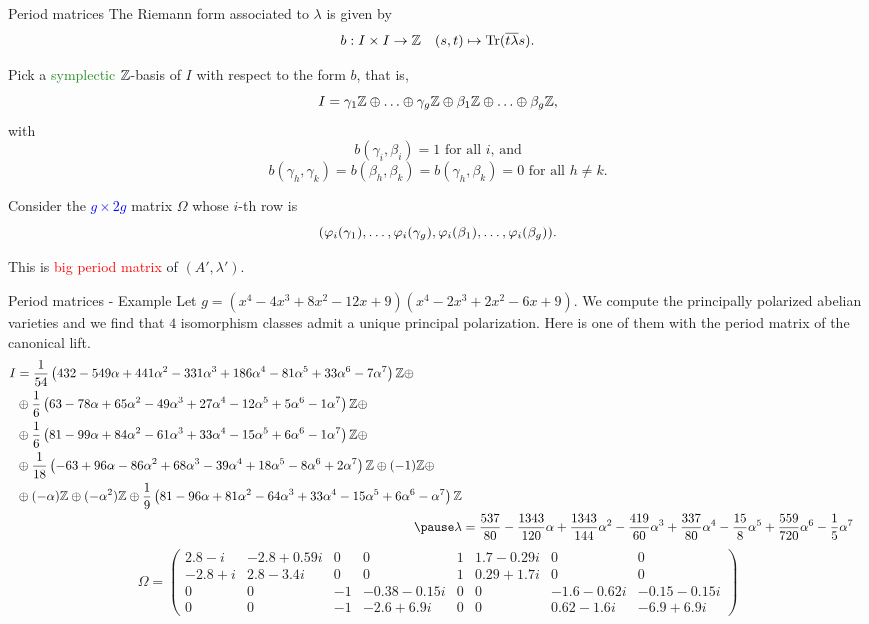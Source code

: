 \documentclass[usenames,dvipsnames,handout]{beamer}
\newcommand{\red}[1]{\textcolor{red}{#1}}
\newcommand{\blue}[1]{\textcolor{blue}{#1}}
\newcommand{\green}[1]{\textcolor{ForestGreen}{#1}}
\begin{document}
\begin{frame}{ Period matrices }
   The Riemann form associated to $\lambda$ is given by
   \[ b:I\times I \to \mathbb{Z} \quad (s,t)\mapsto \operatorname{Tr}(\overline{t\lambda}s). \]
    
   \pause Pick a \green{symplectic} $\mathbb{Z}$-basis of $I$ with respect to the form $b$, that is,
    \[ I = \gamma_1 \mathbb{Z} \oplus \ldots \oplus \gamma_g \mathbb{Z} \oplus \beta_1 \mathbb{Z} \oplus \ldots \oplus \beta_g \mathbb{Z}, \]
    \pause with
    \[ b(\gamma_i,\beta_i)=1 \text{ for all $i$, and}\]
    \[b(\gamma_h,\gamma_k)=b(\beta_h,\beta_k)=b(\gamma_h,\beta_k)=0 \text{ for all $h\neq k$}. \]
    
    \pause Consider the \blue{$g\times 2g$} matrix $\Omega$ whose $i$-th row is 
    \[({\varphi}_i(\gamma_1),\ldots,{\varphi}_i(\gamma_g),{\varphi}_i(\beta_1),\ldots,{\varphi}_i(\beta_g)).\]
    
    \pause This is \red{big period matrix} of $(A',\lambda')$.
\end{frame}
    
    
\begin{frame}{ Period matrices - Example }
   Let $g=(x^4 - 4x^3 + 8x^2 - 12x + 9)(x^4 - 2x^3 + 2x^2 - 6x + 9)$.
   \pause We compute the principally polarized abelian varieties and we find that $4$ isomorphism classes admit a unique principal polarization.
   \pause Here is one of them with the period matrix of the canonical lift.
 {\scriptsize\begin{align*}
    \begin{split}
       I & =  \dfrac{1}{54}\left(432-549\alpha+441\alpha^2-331\alpha^3+186\alpha^4-81\alpha^5+33\alpha^6-7\alpha^7\right)\Z\oplus\\
	   & \oplus\dfrac{1}{6}\left(63-78\alpha+65\alpha^2-49\alpha^3+27\alpha^4-12\alpha^5+5\alpha^6-1\alpha^7\right)\Z\oplus\\
           & \oplus\dfrac{1}{6}\left(81-99\alpha+84\alpha^2-61\alpha^3+33\alpha^4-15\alpha^5+6\alpha^6-1\alpha^7\right)\Z\oplus\\
           & \oplus\dfrac{1}{18}\left(-63+96\alpha-86\alpha^2+68\alpha^3-39\alpha^4+18\alpha^5-8\alpha^6+2\alpha^7\right)\Z\oplus(-1)\Z\oplus\\
	   & \oplus(-\alpha)\Z\oplus(-\alpha^2)\Z\oplus\dfrac{1}{9}\left(81-96\alpha+81\alpha^2-64\alpha^3+33\alpha^4-15\alpha^5+6\alpha^6-\alpha^7\right)\Z
    \end{split}\\
    \pause \lambda & = \dfrac{537}{80} -\dfrac{1343}{120}\alpha +\dfrac{1343}{144}\alpha^2 -\dfrac{419}{60}\alpha^3 +\dfrac{337}{80}\alpha^4 -\dfrac{15}{8}\alpha^5 +\dfrac{559}{720}\alpha^6 -\dfrac{1}{5}\alpha^7
    \end{align*}
    \pause
    \[
    \Omega =
    \begin{pmatrix}
      2.8 - i & -2.8 + 0.59i & 0 & 0 & 1 & 1.7 - 0.29i & 0 & 0 \\
      -2.8 + i & 2.8 - 3.4i & 0 & 0 & 1 & 0.29 + 1.7i & 0 & 0 \\
      0 & 0 & -1 & -0.38 - 0.15i & 0 & 0 & -1.6 - 0.62i & -0.15 - 0.15i\\
      0 & 0 & -1 & -2.6 + 6.9i & 0 & 0 & 0.62 - 1.6i & -6.9 + 6.9i
    \end{pmatrix}
    \]}
\end{frame}
\end{document}
